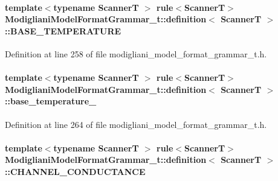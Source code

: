 \paragraph[{BASE\_\-TEMPERATURE}]{\setlength{\rightskip}{0pt plus 5cm}template$<$typename ScannerT $>$ rule$<$ScannerT$>$ {\bf ModiglianiModelFormatGrammar\_\-t::definition}$<$ ScannerT $>$::{\bf BASE\_\-TEMPERATURE}}\hfill\label{struct_modigliani_model_format_grammar__t_1_1definition_ab0b9b6479d64b6b73749e073d583a862}


Definition at line 258 of file modigliani\_\-model\_\-format\_\-grammar\_\-t.h.

\paragraph[{base\_\-temperature\_\-}]{\setlength{\rightskip}{0pt plus 5cm}template$<$typename ScannerT $>$ rule$<$ScannerT$>$ {\bf ModiglianiModelFormatGrammar\_\-t::definition}$<$ ScannerT $>$::{\bf base\_\-temperature\_\-}}\hfill\label{struct_modigliani_model_format_grammar__t_1_1definition_ab52db4dda0d06c21c0d8bf2901210cea}


Definition at line 264 of file modigliani\_\-model\_\-format\_\-grammar\_\-t.h.

\paragraph[{CHANNEL\_\-CONDUCTANCE}]{\setlength{\rightskip}{0pt plus 5cm}template$<$typename ScannerT $>$ rule$<$ScannerT$>$ {\bf ModiglianiModelFormatGrammar\_\-t::definition}$<$ ScannerT $>$::{\bf CHANNEL\_\-CONDUCTANCE}}\hfill\label{struct_modigliani_model_format_grammar__t_1_1definition_a25bc14f17f64ff1ecb8a0848fbc8f7cd}


